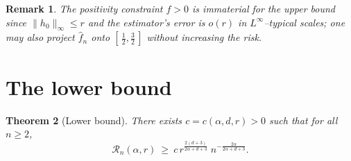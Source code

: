 \documentclass[11pt]{article}
\newtheorem{theorem}{Theorem}[section]
\newtheorem{remark}[theorem]{Remark}
\newcommand{\1}{\mathbf{1}}
\newcommand{\norm}[1]{\lVert #1\rVert}
\begin{document}
\begin{remark}
The positivity constraint $f>0$ is immaterial for the upper bound since
$\norm{h_0}_\infty\le r$ and the estimator's error is $o(r)$ in $L^\infty$--typical
scales; one may also project $\hat f_n$ onto $[\,\tfrac12,\tfrac32\,]$ without
increasing the risk.
\end{remark}

\section{The lower bound}\label{sec:lower}

\begin{theorem}[Lower bound]\label{thm:lower}
There exists $c=c(\alpha,d,r)>0$ such that for all $n\ge2$,
\[
\mathcal R_n(\alpha,r)\ \ge\ c\,r^{\frac{2(d+3)}{2\alpha+d+3}}\;n^{-\frac{2\alpha}{2\alpha+d+3}} .
\]
\end{theorem}
\end{document}
